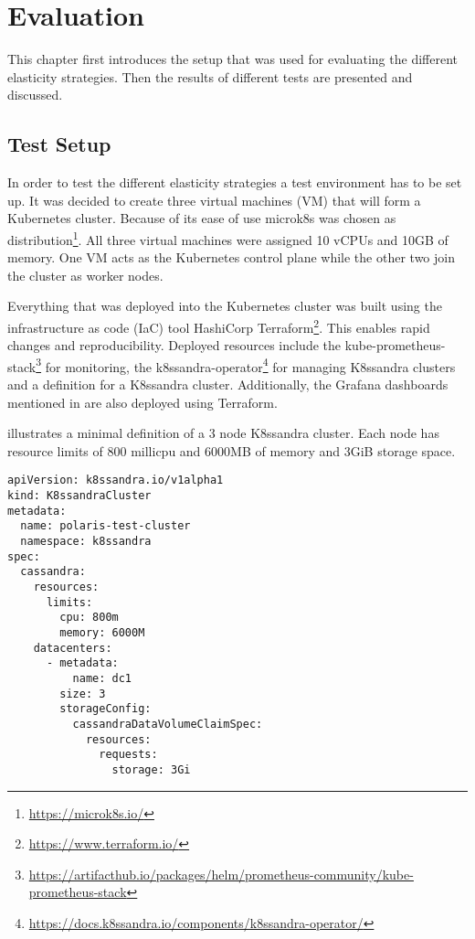 \chapter{Evaluation}
\label{ch:evaluation}

This chapter first introduces the setup that was used for evaluating the different elasticity strategies. Then the results of different tests are presented and discussed.

\section{Test Setup}
\label{sec:testsetup}

In order to test the different elasticity strategies a test environment has to be set up. It was decided to create three virtual machines (VM) that will form a Kubernetes cluster. Because of its ease of use microk8s was chosen as distribution\footnote{\url{https://microk8s.io/}}. All three virtual machines were assigned 10 vCPUs and 10GB of memory. One VM acts as the Kubernetes control plane while the other two join the cluster as worker nodes.

Everything that was deployed into the Kubernetes cluster was built using the infrastructure as code (IaC) tool HashiCorp Terraform\footnote{\url{https://www.terraform.io/}}. This enables rapid changes and reproducibility. Deployed resources include the kube-prometheus-stack\footnote{\raggedright\url{https://artifacthub.io/packages/helm/prometheus-community/kube-prometheus-stack}} for monitoring, the k8ssandra-operator\footnote{\url{https://docs.k8ssandra.io/components/k8ssandra-operator/}} for managing K8ssandra clusters and a definition for a K8ssandra cluster. Additionally, the Grafana dashboards mentioned in  are also deployed using Terraform.

 illustrates a minimal definition of a 3 node K8ssandra cluster. Each node has resource limits of 800 millicpu and 6000MB of memory and 3GiB storage space.

\begin{lstlisting}[caption={Minimal example of a K8ssandraCluster definition.},
                label=lst:k8c,
                captionpos=b,
                float]
apiVersion: k8ssandra.io/v1alpha1
kind: K8ssandraCluster
metadata:
  name: polaris-test-cluster
  namespace: k8ssandra
spec:
  cassandra:
    resources:
      limits:
        cpu: 800m
        memory: 6000M
    datacenters:
      - metadata:
          name: dc1
        size: 3
        storageConfig:
          cassandraDataVolumeClaimSpec:
            resources:
              requests:
                storage: 3Gi
\end{lstlisting}

